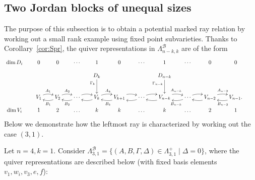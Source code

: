 \documentclass[11pt,reqno]{amsart}
\numberwithin{equation}{section}
\theoremstyle{definition}
\newcommand{\cB}{\mathcal{B}}
\begin{document}
\subsection{Two Jordan blocks of unequal sizes}
The purpose of this subsection is to obtain a potential marked ray relation by working out a small rank example using fixed point subvarieties.
Thanks to Corollary~\ref{cor:Spr}, the quiver representations in $\Lambda^\cB_{n-k,k}$ are of the form
\[ 
\xymatrix@C=18pt@R=9pt{
\dim D_i&0&0&\cdots &1&0&\cdots &1&\cdots &0&0
\\
&
& &  &   
\ar[dd]_<(0.2){\Gamma_k}
D_k
& &  &  
\ar[dd]_<(0.2){\Gamma_{n-k}}
D_{n-k}
 & & &&
\\ & & & & & & &  && 
\\ 
&%
{V_1}  
	\ar@/^/[r]^{A_1} 
	& 
	\ar@/^/[l]^{B_1}
{V_2}
	\ar@/^/[r]^{A_2}
	&
	\ar@/^/[l]^{B_2}
	\cdots   
	\ar@/^/[r]%
	& 
	\ar@/^/[l]%
{V_k}  
	\ar@/^/[r]^{A_{k}}
	&   
{V_{k+1}}  
	\ar@/^/[l]^{B_k}
	\ar@/^/[r]%
	&
	\ar@/^/[l]%
	\cdots
	\ar@/^/[r]%
	&  
{V_{n-k}} 
	\ar@/^/[r]^{A_{n-k}}
	\ar@/^/[l]%
	& 
	\ar@/^/[l]^{B_{n-k}}
	\cdots
	\ar@/^/[r]%
	&
	\ar@/^/[l]%
{V_{n-2}}  
	\ar@/^/[r]^{A_{n-2}}
	& 
{V_{n-1}.} 
\ar@/^/[l]^{B_{n-2}}  
\\
\dim V_i & 1&2&\ldots&k&k&\ldots&k&\ldots&2&1
}
\] 
Below we demonstrate how the leftmost ray is characterized by working out the case $(3,1)$.

\ex\label{ex:31}
Let $n=4, k=1$.
Consider $\Lambda^\cB_{3,1} = \{ (A,B,\Gamma,\Delta) \in \Lambda^+_{3,1} \mid \Delta = 0\}$, where the quiver representations are described below (with fixed basis elements $v_1, w_i, v_3, e, f$):
\end{document}
